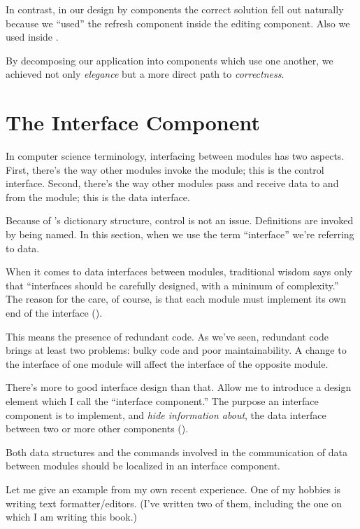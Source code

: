 
In contrast, in our design by components the correct solution fell
out naturally because we ``used'' the refresh component inside the editing
component. Also we used  inside .

By decomposing our application into components which use one another,
we achieved not only \emph{elegance} but a more direct path to
\emph{correctness}.\label{editor2}

\section{The Interface Component}%

In computer science terminology, interfacing between modules has two
aspects. First, there's the way other modules invoke the module; this is
the control interface. Second, there's the way other modules pass and
receive data to and from the module; this is the data interface.

Because of \Forth{}'s dictionary structure, control is not an issue.
Definitions are invoked by being named. In this section, when we use the
term ``interface'' we're referring to data.

When it comes to data interfaces between modules, traditional wisdom
says only that ``interfaces should be carefully designed, with a
minimum of complexity.'' The reason for the care, of course, is that
each module must implement its own end of the interface ().

This means the presence of redundant code. As we've seen, redundant
code brings at least two problems: bulky code and poor maintainability.
A change to the interface of one module will affect the interface
of the opposite module.


There's more to good interface design than that. Allow me to introduce
a design element which I call the ``interface component.'' The purpose
an interface component is to implement, and
\emph{hide information about},%
the data interface between two or more other components
().


\begin{tip}
Both data structures and the commands involved in the communication of
data between modules should be localized in an interface component.
\end{tip}
Let me give an example from my own recent experience. One of my hobbies
is writing text formatter/editors. (I've written two of them, including
the one on which I am writing this book.)

